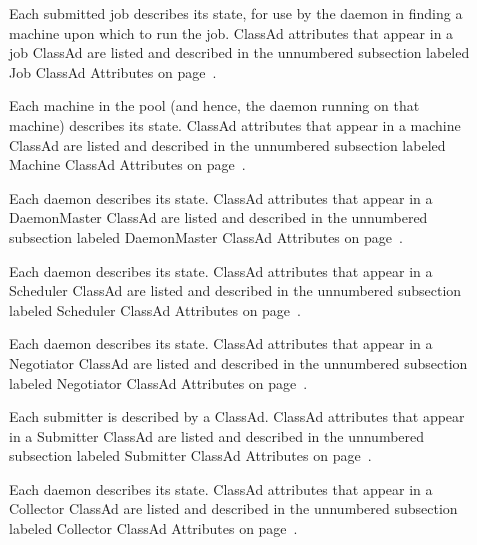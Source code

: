 \begin{description}
  \item[]
  Each submitted job describes its state, for use by the
   daemon in finding a machine upon which to
  run the job.
  ClassAd attributes that appear in a job ClassAd are listed and described in
  the unnumbered subsection labeled Job ClassAd Attributes
  on page~\pageref{sec:Job-ClassAd-Attributes}.

  \item[]
   Each machine in the pool (and hence, the  daemon running
   on that machine) describes its state.
  ClassAd attributes that appear in a machine ClassAd 
  are listed and described in
  the unnumbered subsection labeled Machine ClassAd Attributes
  on page~\pageref{sec:Machine-ClassAd-Attributes}.

  \item[]
   Each  daemon describes its state.
  ClassAd attributes that appear in a DaemonMaster ClassAd 
  are listed and described in
  the unnumbered subsection labeled DaemonMaster ClassAd Attributes
  on page~\pageref{sec:DaemonMaster-ClassAd-Attributes}.

  \item[]
   Each  daemon describes its state.
  ClassAd attributes that appear in a Scheduler ClassAd 
  are listed and described in
  the unnumbered subsection labeled Scheduler ClassAd Attributes
  on page~\pageref{sec:Scheduler-ClassAd-Attributes}.

  \item[]
   Each  daemon describes its state.
  ClassAd attributes that appear in a Negotiator ClassAd 
  are listed and described in
  the unnumbered subsection labeled Negotiator ClassAd Attributes
  on page~\pageref{sec:Negotiator-ClassAd-Attributes}.

  \item[]
   Each submitter is described by a ClassAd.
  ClassAd attributes that appear in a Submitter ClassAd 
  are listed and described in
  the unnumbered subsection labeled Submitter ClassAd Attributes
  on page~\pageref{sec:Submitter-ClassAd-Attributes}.

  \item[]
   Each  daemon describes its state.
  ClassAd attributes that appear in a Collector ClassAd 
  are listed and described in
  the unnumbered subsection labeled Collector ClassAd Attributes
  on page~\pageref{sec:Collector-ClassAd-Attributes}.

  \item[]
  \Todo

\end{description}

